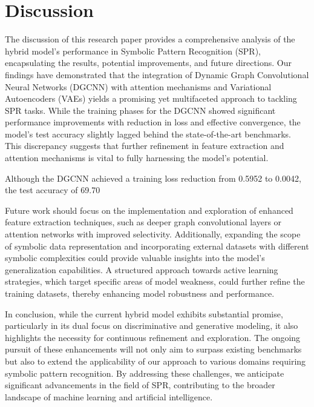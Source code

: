 \documentclass{article}
\begin{document}
\section{Discussion}
The discussion of this research paper provides a comprehensive analysis of the hybrid model's performance in Symbolic Pattern Recognition (SPR), encapsulating the results, potential improvements, and future directions. Our findings have demonstrated that the integration of Dynamic Graph Convolutional Neural Networks (DGCNN) with attention mechanisms and Variational Autoencoders (VAEs) yields a promising yet multifaceted approach to tackling SPR tasks. While the training phases for the DGCNN showed significant performance improvements with reduction in loss and effective convergence, the model's test accuracy slightly lagged behind the state-of-the-art benchmarks. This discrepancy suggests that further refinement in feature extraction and attention mechanisms is vital to fully harnessing the model's potential.

Although the DGCNN achieved a training loss reduction from 0.5952 to 0.0042, the test accuracy of 69.70%

Future work should focus on the implementation and exploration of enhanced feature extraction techniques, such as deeper graph convolutional layers or attention networks with improved selectivity. Additionally, expanding the scope of symbolic data representation and incorporating external datasets with different symbolic complexities could provide valuable insights into the model's generalization capabilities. A structured approach towards active learning strategies, which target specific areas of model weakness, could further refine the training datasets, thereby enhancing model robustness and performance.

In conclusion, while the current hybrid model exhibits substantial promise, particularly in its dual focus on discriminative and generative modeling, it also highlights the necessity for continuous refinement and exploration. The ongoing pursuit of these enhancements will not only aim to surpass existing benchmarks but also to extend the applicability of our approach to various domains requiring symbolic pattern recognition. By addressing these challenges, we anticipate significant advancements in the field of SPR, contributing to the broader landscape of machine learning and artificial intelligence.



\end{document}
